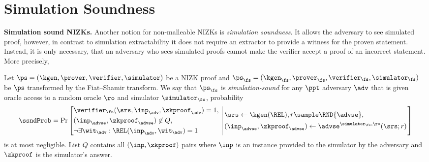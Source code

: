 
\section{Simulation Soundness }
\noindent \textbf{Simulation sound NIZKs.}
Another notion for non-malleable NIZKs is \emph{simulation soundness}. It allows the adversary to see simulated proof, however, in contrast to simulation
extractability it does not require an extractor to provide a witness for the
proven statement. Instead, it is only necessary, that an adversary who sees
simulated proofs cannot make the verifier accept a proof of an incorrect
statement. More precisely,
\begin{definition}
	\label{def:simsnd}
	Let $\ps = (\kgen, \prover, \verifier, \simulator)$ be a NIZK proof and
	$\ps_\fs = (\kgen_\fs, \prover_\fs, \verifier_\fs, \simulator_\fs)$ be $\ps$
	transformed by the Fiat--Shamir transform. We say that $\ps_\fs$ is
	\emph{simulation-sound}
	for any $\ppt$ adversary $\adv$ that is given oracle access to a random
	oracle $\ro$ and simulator $\simulator_\fs$, probability
	\[
	\ssndProb =
	\Pr\left[
	\begin{aligned}
	& \verifier_\fs(\srs, \inp_{\adv}, \zkproof_{\adv}) = 1,\\
	& (\inp_{\advse}, \zkproof_{\advse}) \not\in Q,\\
	& \neg \exists \wit_{\adv}: \REL(\inp_{\adv}, \wit_{\adv}) = 1
	\end{aligned}
	\, \left| \,
	\vphantom{\begin{aligned}
		& \verifier_\fs(\srs, \inp_{\adv}, \zkproof_{\adv}) = 1,\\
		& (\inp_{\advse}, \zkproof_{\advse}) \not\in Q,\\
		& \neg \exists \wit_{\adv}: \REL(\inp_{\adv}, \wit_{\adv}) = 1
		\end{aligned}}
	\begin{aligned}
	& \srs \gets \kgen(\REL), r \sample \RND{\advse},\\
	& (\inp_{\advse}, \zkproof_{\advse}) \gets \advse^{\simulator_\fs,
		\ro} (\srs; r)
	\end{aligned}
	\right.  \right]
	\]
	is at most negligible.  List $Q$ contains all $(\inp, \zkproof)$ pairs where
	$\inp$ is an instance provided to the simulator by the adversary and
	$\zkproof$ is the simulator's answer. 
\end{definition}

